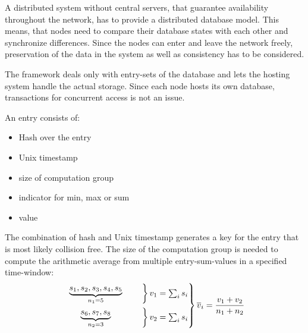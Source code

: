 		A distributed system without central servers, that guarantee availability throughout the network, has to provide a distributed database model. This means, that nodes need to compare their database states with each other and synchronize differences. Since the nodes can enter and leave the network freely, preservation of the data in the system as well as consistency has to be considered.
		
		The framework deals only with entry-sets of the database and lets the hosting system handle the actual storage. Since each node hosts its own database, transactions for concurrent access is not an issue.
		
		\noindent An entry consists of:
		\begin{itemize}
			\item Hash over the entry
			\item Unix timestamp
			\item size of computation group
			\item indicator for min, max or sum
			\item value
		\end{itemize}
		
		The combination of hash and Unix timestamp generates a key for the entry that is most likely collision free. The size of the computation group is needed to compute the arithmetic average from multiple entry-sum-values in a specified time-window: 
		\begin{align*}
			\begin{rcases*}
				\begin{rcases*}
					\mathmakebox[2.5cm][c]{ \underbrace{s_1, s_2, s_3, s_4, s_5}_{n_1=5} }  & \quad
				\end{rcases*} v_1=\sum_{i}s_i \\
				\begin{rcases*}
					\mathmakebox[2.5cm][c]{ \underbrace{s_6, s_7, s_8}_{n_2=3} } & \quad
				\end{rcases*} v_2=\sum_{i}s_i
			\end{rcases*} \overline{v}_i=\frac{v_1+v_2}{n_1+n_2}
		\end{align*}
		 
